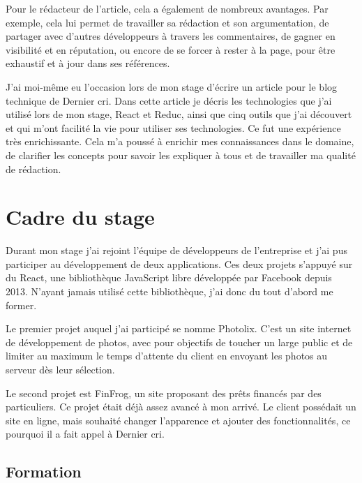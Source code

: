 \bigskip

Pour le rédacteur de l'article, cela a également de nombreux avantages.
Par exemple, cela lui permet de travailler sa rédaction et son
argumentation, de partager avec d'autres développeurs à travers les
commentaires, de gagner en visibilité et en réputation, ou encore de se
forcer à rester à la page, pour être exhaustif et à jour dans ses
références.

\bigskip

J'ai moi-même eu l'occasion lors de mon stage d'écrire un article pour
le blog technique de Dernier cri. Dans cette article je décris les
technologies que j'ai utilisé lors de mon stage, React et Reduc, ainsi
que cinq outils que j'ai découvert et qui m'ont facilité la vie pour
utiliser ses technologies. Ce fut une expérience très enrichissante.
Cela m'a poussé à enrichir mes connaissances dans le domaine, de
clarifier les concepts pour savoir les expliquer à tous et de travailler
ma qualité de rédaction.

\newpage

\section{Cadre du stage}\label{cadre-du-stage}

\bigskip

Durant mon stage j'ai rejoint l'équipe de développeurs de l'entreprise
et j'ai pus participer au développement de deux applications. Ces deux
projets s'appuyé sur du React, une bibliothèque JavaScript libre
développée par Facebook depuis 2013. N'ayant jamais utilisé cette
bibliothèque, j'ai donc du tout d'abord me former.

\bigskip

Le premier projet auquel j'ai participé se nomme Photolix. C'est un site
internet de développement de photos, avec pour objectifs de toucher un
large public et de limiter au maximum le temps d'attente du client en
envoyant les photos au serveur dès leur sélection.

\bigskip

Le second projet est FinFrog, un site proposant des prêts financés par
des particuliers. Ce projet était déjà assez avancé à mon arrivé. Le
client possédait un site en ligne, mais souhaité changer l'apparence et
ajouter des fonctionnalités, ce pourquoi il a fait appel à Dernier cri.

\bigskip

\subsection{Formation}\label{formation}

